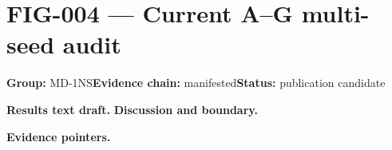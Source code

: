 \clearpage
\section{FIG-004 --- Current A--G multi-seed audit}
\label{figpage:fig-004}
\textbf{Group:} MD-1NS\quad \textbf{Evidence chain:} manifested\quad \textbf{Status:} publication candidate

\textbf{Results text draft.} 
\textbf{Discussion and boundary.} 


\textbf{Evidence pointers.}



\vfill
